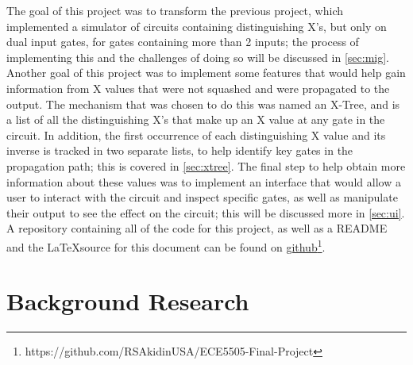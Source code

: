 \documentclass[12pt]{report}
\begin{document}
The goal of this project was to transform the previous project, which implemented a simulator of circuits containing distinguishing X’s, but only on dual input gates, for gates containing more than 2 inputs; the process of implementing this and the challenges of doing so will be discussed in \cref{sec:mig}. Another goal of this project was to implement some features that would help gain information from X values that were not squashed and were propagated to the output. The mechanism that was chosen to do this was named an X-Tree, and is a list of all the distinguishing X’s that make up an X value at any gate in the circuit. In addition, the first occurrence of each distinguishing X value and its inverse is tracked in two separate lists, to help identify key gates in the propagation path; this is covered in \cref{sec:xtree}. The final step to help obtain more information about these values was to implement an interface that would allow a user to interact with the circuit and inspect specific gates, as well as manipulate their output to see the effect on the circuit; this will be discussed more in \cref{sec:ui}. A repository containing all of the code for this project, as well as a README and the \LaTeX source for this document can be found on \href{https://github.com/RSAkidinUSA/ECE5505-Final-Project}{github}\footnote{https://github.com/RSAkidinUSA/ECE5505-Final-Project}.

\section{Background Research}
\end{document}
